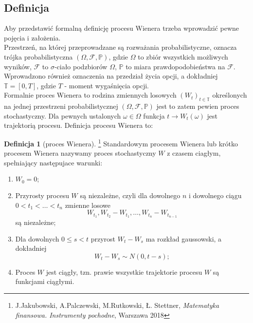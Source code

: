 \documentclass[]{pwr_wmat_praca_dyplomowa}
\theoremstyle{plain}
\numberwithin{theorem}{chapter}
\theoremstyle{definition}
\numberwithin{theorem}{chapter}
\newtheorem{definition}[theorem]{Definicja}
\begin{document}
\subsection{Definicja}
Aby przedstawić formalną definicję procesu Wienera trzeba wprowadzić pewne pojęcia i założenia. \\

Przestrzeń, na której przeprowadzane są rozważania probabilistyczne, oznacza trójka probabilistyczna $(\Omega, \mathcal{F}, \mathbb{P})$, gdzie $\Omega$ to zbiór wszystkich możliwych wyników, $\mathcal{F}$ to $\sigma$-ciało podzbiorów $\Omega$, $\mathbb{P}$ to miara prawdopodobieństwa na $\mathcal{F}$. Wprowadzono również oznaczenia na przedział życia opcji, a dokładniej $\mathbb{T} = [0,T]$, gdzie $T$ - moment wygaśnięcia opcji.\\
\newline
Formalnie proces Wienera to rodzina zmiennych losowych $(W_t)_{t\in \mathbb{T}}$  określonych na jednej przestrzeni probabilistycznej $(\Omega, \mathcal{F}, \mathbb{P})$ jest to zatem pewien proces stochastyczny. Dla pewnych ustalonych $\omega \in \Omega$ funkcja $t \rightarrow W_t(\omega)$ jest trajektorią procesu. Definicja procesu Wienera to:

\begin{definition}[proces Wienera]\footnote{J.Jakubowski, A.Palczewski, M.Rutkowski, Ł. Stettner, \textit{Matematyka finansowa. Instrumenty pochodne}, Warszawa 2018}
Standardowym procesem Wienera lub krótko procesem Wienera nazywamy proces stochastyczny $W$ z czasem ciagłym, spełniający następujace warunki:
\begin{enumerate}
\item $W_0 = 0$;
\item Przyrosty procesu $W$ są niezależne, czyli dla dowolnego $n$ i dowolnego ciągu $0<t_1<\ldots<t_n$ zmienne losowe
$$ W_{t_1}, W_{t_2}-W_{t_1},\ldots, W_{t_n} - W_{t_{n-1}}$$
są niezależne;
\item Dla dowolnych $0\leq s < t$ przyrost $W_t-W_s$ ma rozkład gaussowski, a dokładniej
$$ W_t - W_s \sim N(0,t-s);$$
\item Proces $W$ jest ciągły, tzn. prawie wszystkie trajektorie procesu $W$ są funkcjami ciągłymi.
\end{enumerate}
\end{definition}
\end{document}
